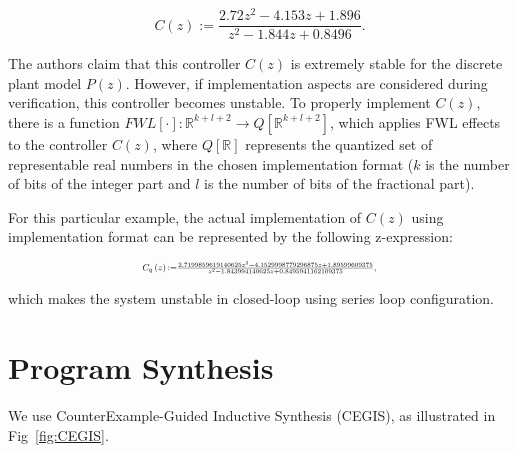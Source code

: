 \documentclass{sig-alternate-05-2015}
\begin{document}
\begin{equation}
\label{Eq:running-example-controller}
C\left(z\right) := \frac{2.72z^2 - 4.153z + 1.896}{z^2 - 1.844z + 0.8496}.
\end{equation}

The authors claim that this controller $C(z)$ is extremely stable for the discrete plant model $P(z)$. However, if implementation aspects are considered during verification, this controller becomes unstable. To properly implement $C(z)$, there is a function $FWL[\cdot]:\mathbb{R}^{k+l+2}\rightarrow Q[\mathbb{R}^{k+l+2}]$, which applies FWL effects to the controller $C(z)$, where $Q[\mathbb{R}]$ represents the quantized set of representable real numbers in the chosen implementation format 
 ($k$ is the number of bits of the integer part and $l$ is the number of bits of the fractional part). 

For this particular example, the actual implementation of $C(z)$ using  implementation format can be represented by the following z-expression:

\begin{equation}
\label{Eq:running-example-controller-quantized}
\resizebox{0.5\textwidth}{!}{
$C_{q}\left(z\right) {:=} \frac{2.7199859619140625z^2 - 4.1529998779296875z + 1.89599609375}{z^2 - 1.843994140625z + 0.8495941162109375},$
}
\end{equation} 

\noindent which makes the system unstable in closed-loop using series loop configuration.

\section{Program Synthesis}

We use CounterExample-Guided Inductive Synthesis (CEGIS), as
illustrated in Fig~\ref{fig:CEGIS}.
\end{document}
